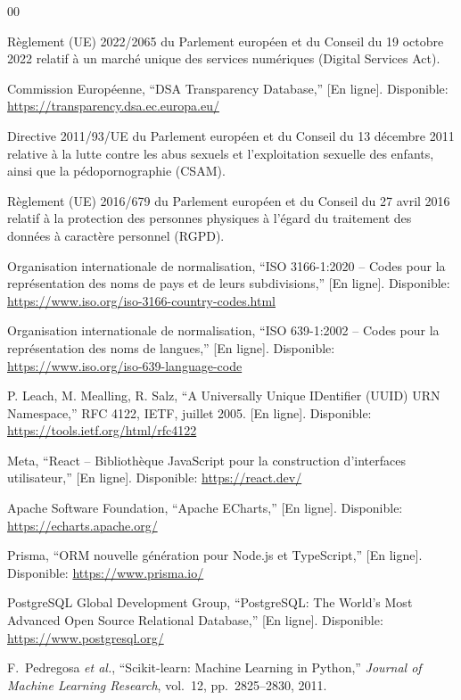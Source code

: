 \documentclass[10pt,twocolumn,a4paper]{article}
\begin{document}
\begin{thebibliography}{00}

 Règlement (UE) 2022/2065 du Parlement européen et du Conseil du 19 octobre 2022 relatif à un marché unique des services numériques (Digital Services Act).

 Commission Européenne, ``DSA Transparency Database,'' [En ligne]. Disponible: \url{https://transparency.dsa.ec.europa.eu/}

 Directive 2011/93/UE du Parlement européen et du Conseil du 13 décembre 2011 relative à la lutte contre les abus sexuels et l'exploitation sexuelle des enfants, ainsi que la pédopornographie (CSAM).

 Règlement (UE) 2016/679 du Parlement européen et du Conseil du 27 avril 2016 relatif à la protection des personnes physiques à l'égard du traitement des données à caractère personnel (RGPD).

 Organisation internationale de normalisation, ``ISO 3166-1:2020 -- Codes pour la représentation des noms de pays et de leurs subdivisions,'' [En ligne]. Disponible: \url{https://www.iso.org/iso-3166-country-codes.html}

 Organisation internationale de normalisation, ``ISO 639-1:2002 -- Codes pour la représentation des noms de langues,'' [En ligne]. Disponible: \url{https://www.iso.org/iso-639-language-code}

 P. Leach, M. Mealling, R. Salz, ``A Universally Unique IDentifier (UUID) URN Namespace,'' RFC 4122, IETF, juillet 2005. [En ligne]. Disponible: \url{https://tools.ietf.org/html/rfc4122}

 Meta, ``React -- Bibliothèque JavaScript pour la construction d'interfaces utilisateur,'' [En ligne]. Disponible: \url{https://react.dev/}

 Apache Software Foundation, ``Apache ECharts,'' [En ligne]. Disponible: \url{https://echarts.apache.org/}

 Prisma, ``ORM nouvelle génération pour Node.js et TypeScript,'' [En ligne]. Disponible: \url{https://www.prisma.io/}

 PostgreSQL Global Development Group, ``PostgreSQL: The World's Most Advanced Open Source Relational Database,'' [En ligne]. Disponible: \url{https://www.postgresql.org/}

 F.~Pedregosa \textit{et al.}, ``Scikit-learn: Machine Learning in Python,'' \textit{Journal of Machine Learning Research}, vol.~12, pp.~2825--2830, 2011.


\end{thebibliography}
\end{document}
